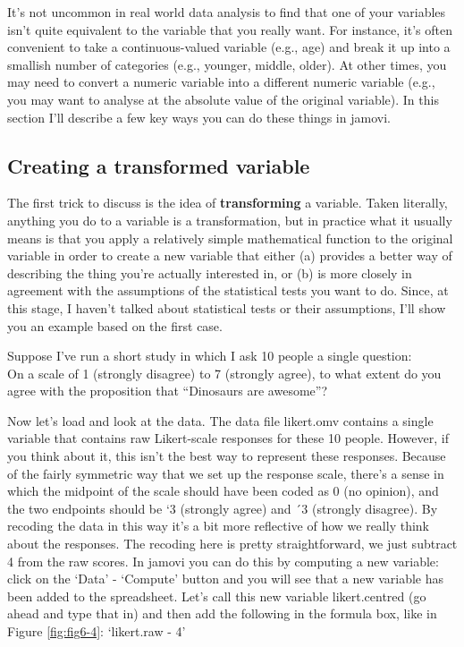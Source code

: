 \documentclass[
]{book}
\begin{document}
It's not uncommon in real world data analysis to find that one of your variables isn't quite equivalent to the variable that you really want. For instance, it's often convenient to take a continuous-valued variable (e.g., age) and break it up into a smallish number of categories (e.g., younger, middle, older). At other times, you may need to convert a numeric variable into a different numeric variable (e.g., you may want to analyse at the absolute value of the original variable). In this section I'll describe a few key ways you can do these things in jamovi.

\hypertarget{creating-a-transformed-variable}{%
\subsection{Creating a transformed variable}\label{creating-a-transformed-variable}}

The first trick to discuss is the idea of \textbf{transforming} a variable. Taken literally, anything you do to a variable is a transformation, but in practice what it usually means is that you apply a relatively simple mathematical function to the original variable in order to create a new variable that either (a) provides a better way of describing the thing you're actually interested in, or (b) is more closely in agreement with the assumptions of the statistical tests you want to do. Since, at this stage, I haven't talked about statistical tests or their assumptions, I'll show you an example based on the first case.

Suppose I've run a short study in which I ask 10 people a single question:\\
On a scale of 1 (strongly disagree) to 7 (strongly agree), to what extent do you agree with the proposition that ``Dinosaurs are awesome''?

Now let's load and look at the data. The data file likert.omv contains a single variable that contains raw Likert-scale responses for these 10 people. However, if you think about it, this isn't the best way to represent these responses. Because of the fairly symmetric way that we set up the response scale, there's a sense in which the midpoint of the scale should have been coded as 0 (no opinion), and the two endpoints should be `3 (strongly agree) and ´3 (strongly disagree). By recoding the data in this way it's a bit more reflective of how we really think about the responses. The recoding here is pretty straightforward, we just subtract 4 from the raw scores. In jamovi you can do this by computing a new variable: click on the `Data' - `Compute' button and you will see that a new variable has been added to the spreadsheet. Let's call this new variable likert.centred (go ahead and type that in) and then add the following in the formula box, like in Figure \ref{fig:fig6-4}: `likert.raw - 4'
\end{document}
